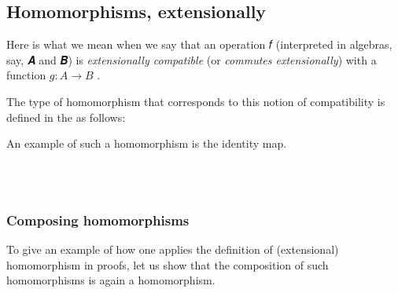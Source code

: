 \documentclass[a4paper,UKenglish,cleveref, autoref, thm-restate]{lipics-v2019}
\begin{document}
\subsection{Homomorphisms, extensionally}
Here is what we mean when we say that an operation 𝑓 (interpreted in algebras, say, 𝑨 and 𝑩) is \emph{extensionally compatible} (or \emph{commutes extensionally}) with a function \(g : A → B\) .
\begin{code}\end{code}
The type of homomorphism that corresponds to this notion of compatibility is defined in the \agdaualib as follows:
\begin{code}\end{code}
An example of such a homomorphism is the identity map.
\begin{code}
\\[\AgdaEmptyExtraSkip]%
\>[0]\AgdaSpace{}%
\AgdaSymbol{:}%
\>[6]\AgdaSymbol{(}\AgdaSpace{}%
\AgdaSymbol{:}\AgdaSpace{}%
\AgdaSpace{}%
\AgdaSpace{}%
\AgdaSymbol{)}\AgdaSpace{}%
\AgdaSpace{}%
\AgdaSpace{}%
\AgdaSpace{}%
\<%
\\
\>[0]\AgdaSpace{}%
\AgdaSymbol{\AgdaUnderscore{}}\AgdaSpace{}%
\AgdaSymbol{=}\AgdaSpace{}%
\AgdaSpace{}%
\AgdaSpace{}%
\AgdaSpace{}%
\AgdaSymbol{)}\AgdaSpace{}%
\AgdaOperator{\AgdaInductiveConstructor{,}}\AgdaSpace{}%
\AgdaSpace{}%
\AgdaBound{\AgdaUnderscore{}}\AgdaSpace{}%
\AgdaBound{\AgdaUnderscore{}}\AgdaSpace{}%
\AgdaSpace{}%
\<%
\end{code}
\subsubsection{Composing homomorphisms}
To give an example of how one applies the definition of (extensional) homomorphism in proofs, let us show that the composition of such homomorphisms is again a homomorphism.
\begin{code}\end{code}
\end{document}
